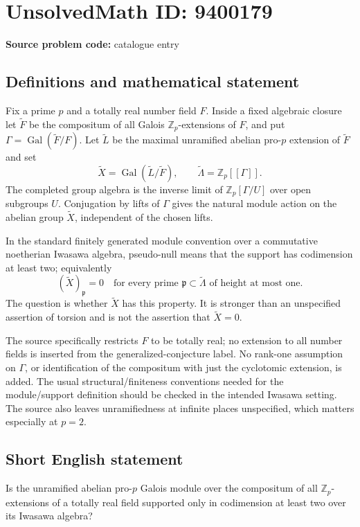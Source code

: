 \documentclass[11pt]{article}
\newcommand{\Z}{\mathbb{Z}}
\begin{document}
\section*{UnsolvedMath ID: 9400179}
\textbf{Source problem code:} catalogue entry
\subsection{Definitions and mathematical statement}
Fix a prime $p$ and a totally real number field $F$. Inside a fixed algebraic closure let $\widetilde F$ be the compositum of all Galois $\Z_p$-extensions of $F$, and put $\Gamma=\operatorname{Gal}(\widetilde F/F)$. Let $\widetilde L$ be the maximal unramified abelian pro-$p$ extension of $\widetilde F$ and set
\[
\widetilde X=\operatorname{Gal}(\widetilde L/\widetilde F),\qquad
\widetilde\Lambda=\Z_p[[\Gamma]].
\]
The completed group algebra is the inverse limit of $\Z_p[\Gamma/U]$ over open subgroups $U$. Conjugation by lifts of $\Gamma$ gives the natural module action on the abelian group $\widetilde X$, independent of the chosen lifts.

In the standard finitely generated module convention over a commutative noetherian Iwasawa algebra, pseudo-null means that the support has codimension at least two; equivalently
\[
(\widetilde X)_{\mathfrak p}=0
\quad\text{for every prime }\mathfrak p\subset\widetilde\Lambda
\text{ of height at most one}.
\]
The question is whether $\widetilde X$ has this property. It is stronger than an unspecified assertion of torsion and is not the assertion that $\widetilde X=0$.

The source specifically restricts $F$ to be totally real; no extension to all number fields is inserted from the generalized-conjecture label. No rank-one assumption on $\Gamma$, or identification of the compositum with just the cyclotomic extension, is added. The usual structural/finiteness conventions needed for the module/support definition should be checked in the intended Iwasawa setting. The source also leaves unramifiedness at infinite places unspecified, which matters especially at $p=2$.
\subsection{Short English statement}
Is the unramified abelian pro-$p$ Galois module over the compositum of all $\Z_p$-extensions of a totally real field supported only in codimension at least two over its Iwasawa algebra?
\end{document}
